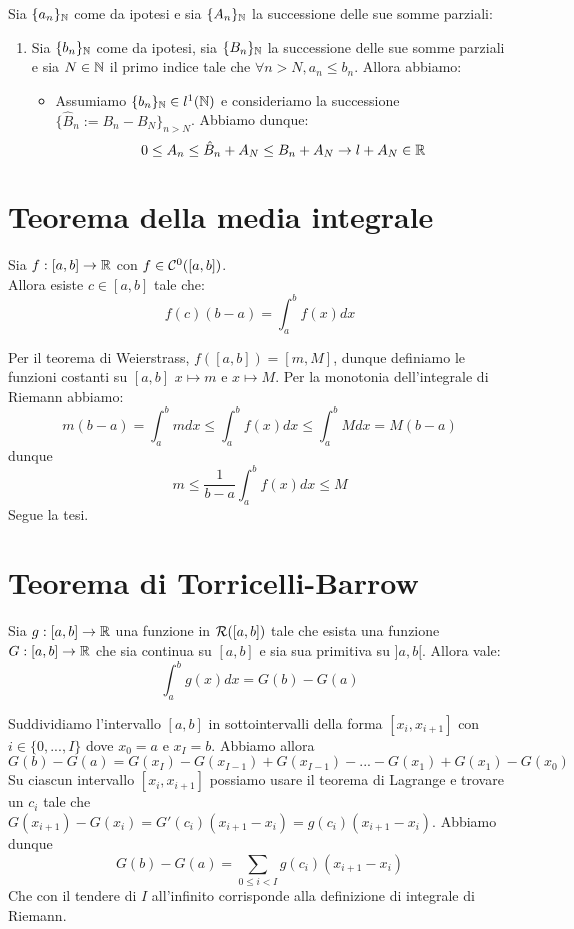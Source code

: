 \documentclass[openany]{book}
\begin{document}
    Sia $\{a_n\}_{\mathbb{N}}$ come da ipotesi e sia $\{A_n\}_{\mathbb{N}}$ la successione delle sue somme parziali:\begin{enumerate}
        \item Sia $\{b_n\}_{\mathbb{N}}$ come da ipotesi, sia $\{B_n\}_{\mathbb{N}}$ la successione delle sue somme parziali e sia $N \in \mathbb{N}$ il primo indice tale che $\forall n>N, a_n\le b_n$. Allora abbiamo:\begin{itemize}
            \item Assumiamo $\{b_n\}_{\mathbb{N}} \in l^1(\mathbb{N})$ e consideriamo la successione $\{\hat{B}_n := B_n - B_N\}_{n>N}$. Abbiamo dunque:
            \[0\le A_n \le \hat{B}_n + A_N \le B_n + A_N \to l + A_N \in \mathbb{R}\]
        \end{itemize}
    \end{enumerate}


\section{Teorema della media integrale}

\begin{theorem}{}{}
    Sia $f : [a, b] \to \mathbb{R}$ con $f \in \mathcal{C}^0([a,b])$.\\
    Allora esiste $c \in [a,b]$ tale che:
    \[f(c)(b-a) =\int_a^b f(x)d x\]
\end{theorem}

    Per il teorema di Weierstrass, $f([a,b]) = [m,M]$, dunque definiamo le funzioni costanti su $[a,b]$ $x\mapsto m$ e $x\mapsto M$. Per la monotonia dell'integrale di Riemann abbiamo:
    \[m(b-a)=\int_a^b m d x \le \int_a^b f(x) d x \le \int_a^b M d x = M(b-a)\]
    dunque 
    \[m \le \frac{1}{b-a}\int_a^b f(x) d x \le M\]
    Segue la tesi.


\section{Teorema di Torricelli-Barrow}

\begin{theorem}{}{}
    Sia $g : [a,b]\to \mathbb{R}$ una funzione in $\mathcal{R}([a,b])$ tale che esista una funzione $G:[a,b]\to \mathbb{R}$ che sia continua su $[a,b]$ e sia sua primitiva su $]a,b[$. Allora vale:
    \[\int_a^b g(x) d x = G(b)-G(a)\]
\end{theorem}

    Suddividiamo l'intervallo $[a,b]$ in sottointervalli della forma $[x_i, x_{i+1}]$ con $i \in \{0,...,I\}$ dove $x_0 = a$ e $x_I = b$. Abbiamo allora
    \[G(b)-G(a) = G(x_I) - G(x_{I-1}) + G(x_{I-1}) - ... - G(x_1) + G(x_1) - G(x_0)\]
    Su ciascun intervallo $[x_i, x_{i+1}]$ possiamo usare il teorema di Lagrange e trovare un $c_i$ tale che $G(x_{i+1}) - G(x_i) = G'(c_i)(x_{i+1}-x_i) = g(c_i)(x_{i+1}-x_i)$. Abbiamo dunque
    \[G(b)-G(a) = \sum_{0\le i < I } g(c_i)(x_{i+1}-x_i)\]
    Che con il tendere di $I$ all'infinito corrisponde alla definizione di integrale di Riemann.
\end{document}
